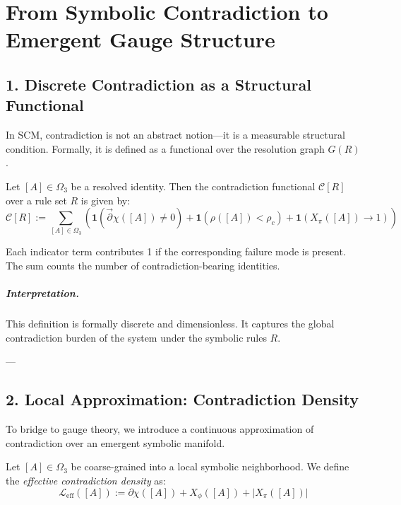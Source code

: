 \chapter{From Symbolic Contradiction to Emergent Gauge Structure}
\label{chapter-contradiction-to-gauge}

\section{1. Discrete Contradiction as a Structural Functional}
\label{sec:discrete-contradiction}

In SCM, contradiction is not an abstract notion—it is a measurable structural condition. Formally, it is defined as a functional over the resolution graph $G(R)$.

\begin{definition}
\label{def:contradiction-functional}
Let $[A] \in \Omega_3$ be a resolved identity. Then the contradiction functional $\mathcal{C}[R]$ over a rule set $R$ is given by:
\[
\mathcal{C}[R] := \sum_{[A] \in \Omega_3} 
\left( 
\mathbf{1}(\vec{\partial}\chi([A]) \ne 0) 
+ \mathbf{1}(\rho([A]) < \rho_c) 
+ \mathbf{1}(X_\pi([A]) \to 1) 
\right)
\]
\end{definition}

\noindent
Each indicator term contributes 1 if the corresponding failure mode is present. The sum counts the number of contradiction-bearing identities.

\paragraph{Interpretation.}
This definition is formally discrete and dimensionless. It captures the global contradiction burden of the system under the symbolic rules $R$.

---

\section{2. Local Approximation: Contradiction Density}
\label{sec:contradiction-density}

To bridge to gauge theory, we introduce a continuous approximation of contradiction over an emergent symbolic manifold.

\begin{definition}
\label{def:contradiction-density}
Let $[A] \in \Omega_3$ be coarse-grained into a local symbolic neighborhood. We define the \emph{effective contradiction density} as:
\[
\mathcal{L}_{\text{eff}}([A]) := 
\partial\chi([A]) + X_\phi([A]) + |X_\pi([A])|
\]
\end{definition}

